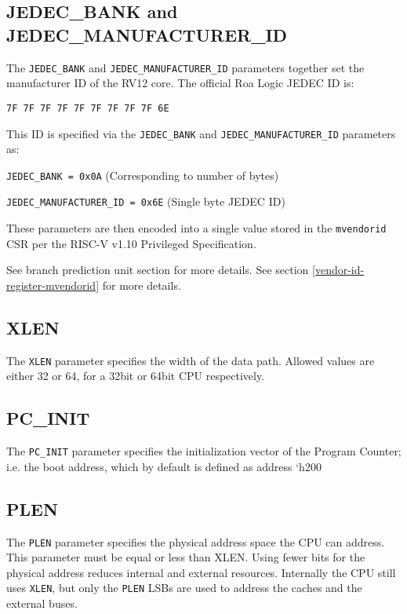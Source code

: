 \subsection{JEDEC\_BANK and JEDEC\_MANUFACTURER\_ID}

The \texttt{JEDEC\_BANK} and \texttt{JEDEC\_MANUFACTURER\_ID} parameters
together set the manufacturer ID of the RV12 core. The official Roa Logic JEDEC
ID is:

 \indent\indent\texttt{7F 7F 7F 7F 7F 7F 7F 7F 7F 6E}

 \noindent This ID is specified via the \texttt{JEDEC\_BANK} and
 \texttt{JEDEC\_MANUFACTURER\_ID} parameters as:

 \indent\indent\texttt{JEDEC\_BANK = 0x0A} (Corresponding to number of bytes)

 \indent\indent\texttt{JEDEC\_MANUFACTURER\_ID = 0x6E} (Single byte JEDEC ID)

\noindent These parameters are then encoded into a single value stored in the
\texttt{mvendorid} CSR per the RISC-V v1.10 Privileged Specification.

\ifdefined\MARKDOWN
See branch prediction unit section for more details.
\else
See section \ref{vendor-id-register-mvendorid}  for more details.
\fi

\subsection{XLEN}\label{xlen}

The \texttt{XLEN} parameter specifies the width of the data path. Allowed values
are either 32 or 64, for a 32bit or 64bit CPU respectively.

\subsection{PC\_INIT}\label{pc_init}

The \texttt{PC\_INIT} parameter specifies the initialization vector of the
Program Counter; i.e. the boot address, which by default is defined as address
`h200

\subsection{PLEN}\label{plen}

The \texttt{PLEN} parameter specifies the physical address space the
CPU can address. This parameter must be equal or less than XLEN. Using fewer
bits for the physical address reduces internal and external resources.
Internally the CPU still uses \texttt{XLEN}, but only the
\texttt{PLEN} LSBs are used to address the caches and the external
buses.

